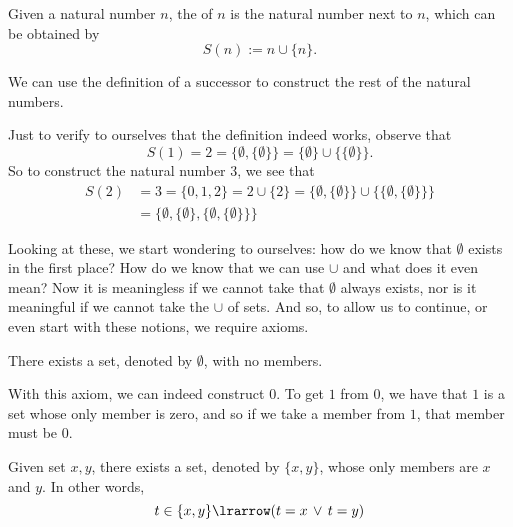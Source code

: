\documentclass[notoc,notitlepage]{tufte-book}
\begin{document}
\begin{defn}[Successor]
\label{defn:successor}
  Given a natural number $n$, the  of $n$ is the natural number next to $n$, which can be obtained by
  \begin{equation*}
    S(n) := n \cup \{ n \}.
  \end{equation*}
\end{defn}

We can use the definition of a successor to construct the rest of the natural numbers.

\begin{eg}
  Just to verify to ourselves that the definition indeed works, observe that
  \begin{equation*}
    S(1) = 2 = \{ \emptyset, \{ \emptyset \} \} = \{ \emptyset \} \cup \{ \{ \emptyset \} \}.
  \end{equation*}
  So to construct the natural number $3$, we see that
  \begin{align*}
    S(2) &= 3 = \{ 0, 1, 2 \} = 2 \cup \{ 2 \} = \{ \emptyset, \{ \emptyset \} \} \cup \{ \{ \emptyset, \{ \emptyset \} \} \} \\
         &= \{ \emptyset, \{ \emptyset \}, \{ \emptyset, \{ \emptyset \} \} \}
  \end{align*}
\end{eg}

Looking at these, we start wondering to ourselves: how do we know that $\emptyset$ exists in the first place? How do we know that we can use $\cup$ and what does it even mean? Now it is meaningless if we cannot take that $\emptyset$ always exists, nor is it meaningful if we cannot take the $\cup$ of sets. And so, to allow us to continue, or even start with these notions, we require axioms.

\begin{axiom}
\label{axiom:empty_set_axiom}
  There exists a set, denoted by $\emptyset$, with no members.
\end{axiom}

With this axiom, we can indeed construct $0$. To get $1$ from $0$, we have that $1$ is a set whose only member is zero, and so if we take a member from $1$, that member must be $0$.

\begin{axiom}
\label{axiom:pairset_axiom}
  Given set $x, y$, there exists a set, denoted by $\{x , y\}$, whose only members are $x$ and $y$. In other words,
  \begin{equation*}
    t \in \{ x, y \} \lrarrow ( t = x \, \lor \, t = y )
  \end{equation*}
\end{axiom}
\end{document}
